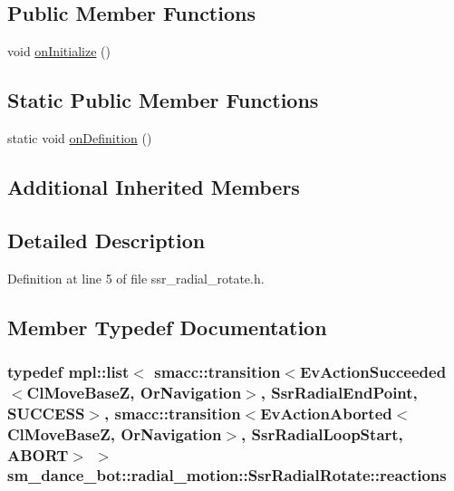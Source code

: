 \subsection*{Public Member Functions}
\begin{DoxyCompactItemize}
\item 
void \hyperlink{structsm__dance__bot_1_1radial__motion_1_1SsrRadialRotate_a94b5d9fd586f5aa35aa2e1e3ec66e17d}{on\+Initialize} ()
\end{DoxyCompactItemize}
\subsection*{Static Public Member Functions}
\begin{DoxyCompactItemize}
\item 
static void \hyperlink{structsm__dance__bot_1_1radial__motion_1_1SsrRadialRotate_a9a15be0b979a98d96d16364a1e7db919}{on\+Definition} ()
\end{DoxyCompactItemize}
\subsection*{Additional Inherited Members}


\subsection{Detailed Description}


Definition at line 5 of file ssr\+\_\+radial\+\_\+rotate.\+h.



\subsection{Member Typedef Documentation}
\subsubsection[{\texorpdfstring{reactions}{reactions}}]{\setlength{\rightskip}{0pt plus 5cm}typedef mpl\+::list$<$ {\bf smacc\+::transition}$<$Ev\+Action\+Succeeded$<${\bf Cl\+Move\+BaseZ}, {\bf Or\+Navigation}$>$, {\bf Ssr\+Radial\+End\+Point}, {\bf S\+U\+C\+C\+E\+SS}$>$, {\bf smacc\+::transition}$<$Ev\+Action\+Aborted$<${\bf Cl\+Move\+BaseZ}, {\bf Or\+Navigation}$>$, {\bf Ssr\+Radial\+Loop\+Start}, {\bf A\+B\+O\+RT}$>$ $>$ {\bf sm\+\_\+dance\+\_\+bot\+::radial\+\_\+motion\+::\+Ssr\+Radial\+Rotate\+::reactions}}\hypertarget{structsm__dance__bot_1_1radial__motion_1_1SsrRadialRotate_ae1c62735d1c8441d1660db84244985c8}{}\label{structsm__dance__bot_1_1radial__motion_1_1SsrRadialRotate_ae1c62735d1c8441d1660db84244985c8}


